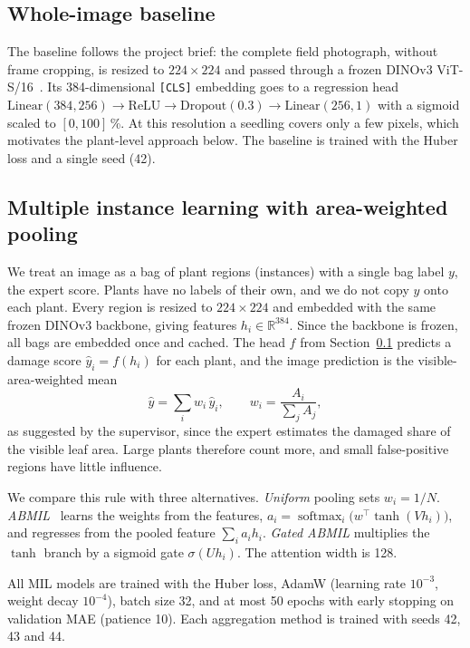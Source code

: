 \subsection{Whole-image baseline}
\label{sec:baseline}

The baseline follows the project brief: the complete field photograph, without frame cropping,
is resized to $224\times224$ and passed through a frozen DINOv3 ViT-S/16~\cite{dinov3}. Its 384-dimensional \texttt{[CLS]}
embedding goes to a regression head
$\text{Linear}(384,256)\!\to\!\text{ReLU}\!\to\!\text{Dropout}(0.3)\!\to\!\text{Linear}(256,1)$
with a sigmoid scaled to $[0,100]$\,\%. At this resolution a seedling covers only a few pixels,
which motivates the plant-level approach below. The baseline is trained with the Huber loss
and a single seed (42).

\subsection{Multiple instance learning with area-weighted pooling}
\label{sec:mil}

We treat an image as a bag of plant regions (instances) with a single bag label $y$, the expert
score. Plants have no labels of their own, and we do not copy $y$ onto each plant. Every region is
resized to $224\times224$ and embedded with the same frozen DINOv3 backbone, giving features
$h_i \in \mathbb{R}^{384}$. Since the backbone is frozen, all bags are embedded once and cached.
The head $f$ from Section~\ref{sec:baseline} predicts a damage score $\hat y_i = f(h_i)$ for each
plant, and the image prediction is the visible-area-weighted mean
\begin{equation}
  \hat y = \sum_i w_i\, \hat y_i, \qquad w_i = \frac{A_i}{\sum_j A_j},
  \label{eq:weighted}
\end{equation}
as suggested by the supervisor, since the expert estimates the damaged share of the visible leaf
area. Large plants therefore count more, and small false-positive regions have little influence.

We compare this rule with three alternatives. \emph{Uniform} pooling sets $w_i = 1/N$.
\emph{ABMIL}~\cite{ilse2018attention} learns the weights from the features,
$a_i = \operatorname{softmax}_i\!\big(w^\top \tanh(V h_i)\big)$, and regresses from the pooled
feature $\sum_i a_i h_i$. \emph{Gated ABMIL} multiplies the $\tanh$ branch by a sigmoid gate
$\sigma(U h_i)$. The attention width is 128.

All MIL models are trained with the Huber loss, AdamW (learning rate $10^{-3}$, weight decay
$10^{-4}$), batch size 32, and at most 50 epochs with early stopping on validation MAE (patience
10). Each aggregation method is trained with seeds 42, 43 and 44.

